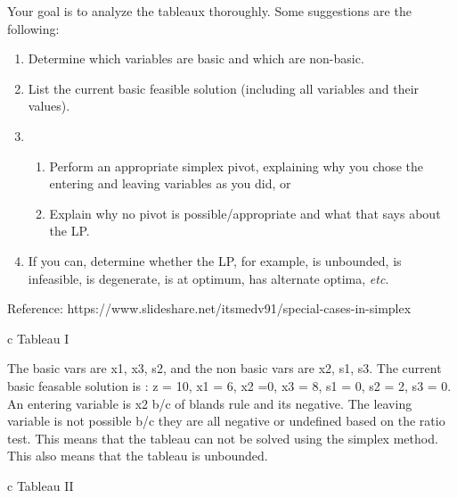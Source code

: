 \begin{enumerate}
Your goal is to analyze the tableaux thoroughly.
Some suggestions are the following:
\begin{enumerate}
\item Determine which variables are basic and which are non-basic.
\item List the current basic feasible solution (including all variables and their values).
\item
\begin{enumerate}
\item  Perform an appropriate simplex pivot, explaining why you
  chose the entering and leaving variables as you did, or
\item  Explain why no pivot is possible/appropriate and what that says about the LP.
\end{enumerate}
\item If you can, determine whether the LP, for example,
is unbounded, is infeasible, is degenerate, is at optimum, has alternate optima,
\emph{etc}.
\end{enumerate}
Reference: https://www.slideshare.net/itsmedv91/special-cases-in-simplex
\begin{center}
  \begin{tabular}{c}
  Tableau I\\
\end{tabular}
\end{center}


The basic vars are x1, x3, s2, and the non basic vars are x2, s1, s3. The current basic feasable solution is : z = 10, x1 = 6, x2 =0, x3 = 8, s1 = 0, s2 = 2, s3 = 0. An entering variable is x2 b/c of blands rule and its negative. The leaving variable is not possible b/c they are all negative or undefined based on the ratio test. This means that the tableau can not be solved using the simplex method. This also means that the tableau is unbounded.


\begin{center}
  \begin{tabular}{c}
    Tableau II \\
  \end{tabular}
\end{center}



\end{enumerate}
